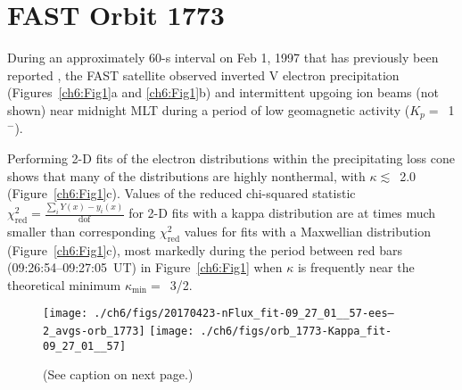   \section{FAST Orbit 1773}

  During an approximately 60-s interval on Feb 1, 1997 that has previously been
  reported \citep{Elphic1998,Chaston2002b}, the FAST satellite observed inverted
  V electron precipitation (Figures~\ref{ch6:Fig1}a and \ref{ch6:Fig1}b) and
  intermittent upgoing ion beams (not shown) near midnight MLT during a period
  of low geomagnetic activity ($K_p =$~1$^-$).

  Performing 2-D fits of the electron distributions within the precipitating
  loss cone shows that many of the distributions are highly nonthermal, with
  $\kappa \lesssim$~2.0 (Figure~\ref{ch6:Fig1}c). Values of the reduced
  chi-squared statistic $\chi^2_{\mathrm{red}} = \frac{\sum_i Y(x) -
    y_i(x)}{\mathrm{dof}}$ for 2-D fits with a kappa distribution are at times
  much smaller than corresponding $\chi^2_{\textrm{red}}$ values for fits with a
  Maxwellian distribution (Figure~\ref{ch6:Fig1}c), most markedly during the
  period between red bars (09:26:54--09:27:05~UT) in Figure~\ref{ch6:Fig1} when
  $\kappa$ is frequently near the theoretical minimum $\kappa_{\mathrm{min}}
  =$~3/2.


  \begin{figure}
    \centering
    \noindent\texttt{[image: ./ch6/figs/20170423-nFlux\_fit-09\_27\_01\_\_57-ees--2\_avgs-orb\_1773]}
    \noindent\texttt{[image: ./ch6/figs/orb\_1773-Kappa\_fit-09\_27\_01\_\_57]}
    \caption[Example of one- and two-dimensional fits of observed inverted-V
    electron distributions (Orbit 1773)]{(See caption on next page.)}
    \label{ch6:Fig2}
  \end{figure}

